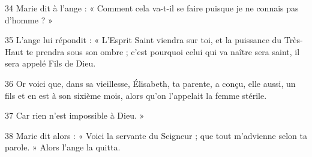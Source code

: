 
34 Marie dit à l’ange : « Comment cela va-t-il se faire puisque je ne connais pas d’homme ? »

35 L’ange lui répondit : « L’Esprit Saint viendra sur toi, et la puissance du Très-Haut te prendra sous son ombre ; c’est pourquoi celui qui va naître sera saint, il sera appelé Fils de Dieu.

36 Or voici que, dans sa vieillesse, Élisabeth, ta parente, a conçu, elle aussi, un fils et en est à son sixième mois, alors qu’on l’appelait la femme stérile.

37 Car rien n’est impossible à Dieu. »

38 Marie dit alors : « Voici la servante du Seigneur ; que tout m’advienne selon ta parole. » Alors l’ange la quitta.